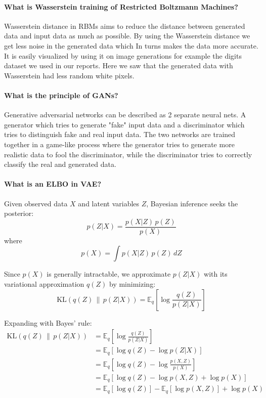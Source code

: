 \paragraph{What is Wasserstein training of Restricted Boltzmann Machines?}

Wasserstein distance in RBMs aims to reduce the distance between generated data and input data as
much as possible. By using the Wasserstein distance we get less noise in the generated data which In
turns makes the data more accurate. It is easily visualized by using it on image generations for
example the digits dataset we used in our reports. Here we saw that the generated data with
Wasserstein had less random white pixels.

\paragraph{What is the principle of GANs?}

Generative adversarial networks can be described as 2 separate neural nets. A generator which tries
to generate "fake" input data and a discriminator which tries to distinguish fake and real input data.
The two networks are trained together in a game-like process where the generator tries to generate
more realistic data to fool the discriminator, while the discriminator tries to correctly classify the real
and generated data.

\paragraph{What is an ELBO in VAE?}

Given observed data \( X \) and latent variables \( Z \), Bayesian inference seeks the posterior:
\begin{equation}
p(Z|X) = \frac{p(X|Z)\, p(Z)}{p(X)}
\end{equation}
where
\begin{equation}
p(X) = \int p(X|Z)\, p(Z)\, dZ
\end{equation}

Since \( p(X) \) is generally intractable, we approximate \( p(Z|X) \) with its variational approximation \( q(Z) \) by minimizing:
\begin{equation}
\mathrm{KL}(q(Z) \,\|\, p(Z|X)) = \mathbb{E}_{q} \left[ \log \frac{q(Z)}{p(Z|X)} \right]
\end{equation}

Expanding with Bayes' rule:
\begin{align}
\mathrm{KL}(q(Z) \,\|\, p(Z|X)) 
&= \mathbb{E}_q \left[ \log \frac{q(Z)}{p(Z|X)} \right]\\
&= \mathbb{E}_q \left[ \log q(Z) - \log p(Z|X) \right]\\
&= \mathbb{E}_q \left[ \log q(Z) - \log \frac{p(X, Z)}{p(X)} \right]\\
&= \mathbb{E}_q \left[ \log q(Z) - \log p(X, Z) + \log p(X) \right]\\
&= \mathbb{E}_q [\log q(Z)] - \mathbb{E}_q [\log p(X, Z)] + \log p(X)
\end{align}

